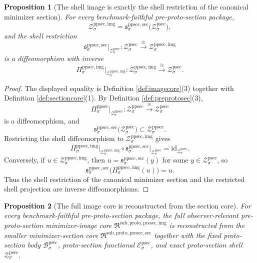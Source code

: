 \documentclass[11pt]{article}
\newcommand{\ProtoSectionBody}[1]{\mathcal B_{#1}^{\mathrm{psec}}}
\newcommand{\ProtoSectionFunctional}[1]{\mathscr E_{#1}^{\mathrm{psec}}}
\newcommand{\ProtoSectionShell}[1]{\mathcal Z_{#1}^{\mathrm{psec}}}
\newcommand{\PreProtoSectionProj}[1]{\Pi_{#1}^{\mathrm{ppsec}}}
\newcommand{\PreProtoSectionShell}[1]{\mathcal Z_{#1}^{\mathrm{ppsec}}}
\newcommand{\PreProtoSectionImageCore}{\mathfrak R^{\mathrm{sub,proto,presec,img}}}
\newcommand{\PreProtoSectionImgProj}[1]{\Pi_{#1}^{\mathrm{ppsec,img}}}
\newcommand{\PreProtoSectionImgShell}[1]{\mathcal Z_{#1}^{\mathrm{ppsec,img}}}
\newcommand{\PreProtoSectionMinSectionCore}{\mathfrak R^{\mathrm{sub,proto,presec,sec}}}
\newcommand{\PreProtoSectionMinSection}[1]{\mathfrak s_{#1}^{\mathrm{ppsec,sec}}}
\newtheorem{proposition}{Proposition}
\begin{document}
\begin{proposition}[The shell image is exactly the shell restriction of the canonical minimizer section]
\label{prop:reconstructshell}
For every benchmark-faithful pre-proto-section package,
\[
\PreProtoSectionImgShell{\sigma}
=
\PreProtoSectionMinSection{\sigma}\bigl(\ProtoSectionShell{\sigma}\bigr),
\]
and the shell restriction
\[
\PreProtoSectionMinSection{\sigma}\big|_{\ProtoSectionShell{\sigma}}
:
\ProtoSectionShell{\sigma}\xrightarrow{\cong}\PreProtoSectionImgShell{\sigma}
\]
is a diffeomorphism with inverse
\[
\PreProtoSectionImgProj{\sigma}\big|_{\PreProtoSectionImgShell{\sigma}}
:
\PreProtoSectionImgShell{\sigma}\xrightarrow{\cong}\ProtoSectionShell{\sigma}.
\]
\end{proposition}

\begin{proof}
The displayed equality is Definition \ref{def:imagecore}(3) together with Definition \ref{def:sectioncore}(1). By Definition \ref{def:preprotosec}(3),
\[
\PreProtoSectionProj{\sigma}\big|_{\PreProtoSectionShell{\sigma}}
:
\PreProtoSectionShell{\sigma}\xrightarrow{\cong}\ProtoSectionShell{\sigma}
\]
is a diffeomorphism, and
\[
\PreProtoSectionMinSection{\sigma}\bigl(\ProtoSectionShell{\sigma}\bigr)
\subset
\PreProtoSectionShell{\sigma}.
\]
Restricting the shell diffeomorphism to \(\PreProtoSectionImgShell{\sigma}\) gives
\[
\PreProtoSectionImgProj{\sigma}\big|_{\PreProtoSectionImgShell{\sigma}}
\circ
\PreProtoSectionMinSection{\sigma}\big|_{\ProtoSectionShell{\sigma}}
=
\mathrm{id}_{\ProtoSectionShell{\sigma}}.
\]
Conversely, if \(u\in\PreProtoSectionImgShell{\sigma}\), then \(u=\PreProtoSectionMinSection{\sigma}(y)\) for some \(y\in\ProtoSectionShell{\sigma}\), so
\[
\PreProtoSectionMinSection{\sigma}\bigl(\PreProtoSectionImgProj{\sigma}(u)\bigr)
=
u.
\]
Thus the shell restriction of the canonical minimizer section and the restricted shell projection are inverse diffeomorphisms.
\end{proof}

\begin{proposition}[The full image core is reconstructed from the section core]
\label{prop:reconstructimage}
For every benchmark-faithful pre-proto-section package, the full observer-relevant pre-proto-section minimizer-image core \(\PreProtoSectionImageCore\) is reconstructed from the smaller minimizer-section core \(\PreProtoSectionMinSectionCore\) together with the fixed proto-section body \(\ProtoSectionBody{\sigma}\), proto-section functional \(\ProtoSectionFunctional{\sigma}\), and exact proto-section shell \(\ProtoSectionShell{\sigma}\).
\end{proposition}
\end{document}
